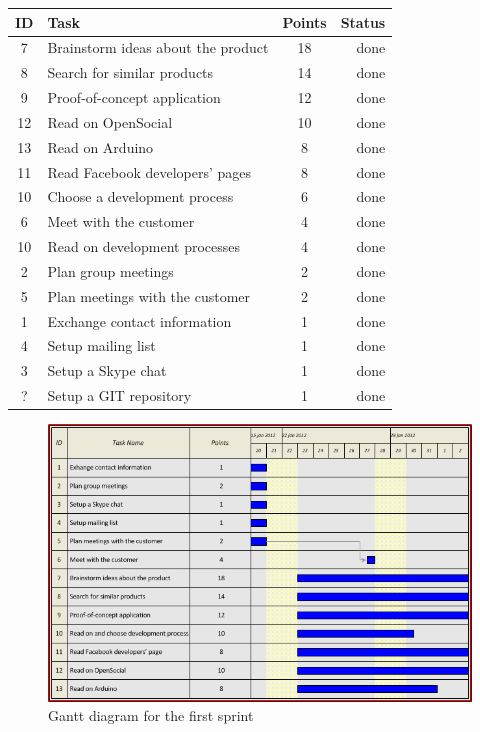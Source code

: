 \begin{table}[ht!]
\begin{tabular}{ | c | l | c | r | }

\hline
\textbf{ID} & \textbf{Task} & \textbf{Points} & \textbf{Status} \\
\hline

 7 & Brainstorm ideas about the product		& 18 & done \\
\hline
 8 & Search for similar products			& 14 & done \\
\hline
 9 & Proof-of-concept application			& 12 & done \\
\hline
12 & Read on OpenSocial						& 10 & done \\
\hline
13 & Read on Arduino						& 8  & done \\
\hline
11 & Read Facebook developers' pages		& 8  & done \\
\hline
10 & Choose a development process			& 6  & done \\
\hline
 6 & Meet with the customer					& 4  & done \\
\hline
10 & Read on development processes			& 4  & done \\
\hline
 2 & Plan group meetings					& 2  & done \\
\hline
 5 & Plan meetings with the customer		& 2  & done \\
\hline
 1 & Exchange contact information			& 1  & done \\
\hline
 4 & Setup mailing list						& 1  & done \\
\hline
 3 & Setup a Skype chat						& 1  & done \\
\hline
 ? & Setup a GIT repository					& 1  & done \\
\hline

\end{tabular}
\end{table}

\newpage

\begin{figure}[h!]
\centering \includegraphics[scale=0.8]{img/sprints-gantt1.png}
\caption{Gantt diagram for the first sprint}
\label{fig:sprints-gantt1}
\end{figure}

